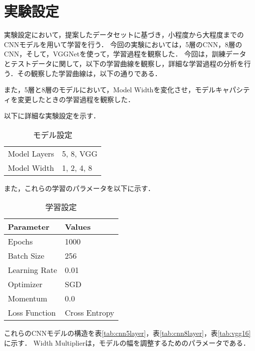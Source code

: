 \section{実験設定}
\label{sec:experiment_settings}
実験設定において，提案したデータセットに基づき，小程度から大程度までのCNNモデルを用いて学習を行う．
今回の実験においては，5層のCNN，8層のCNN，そして，VGGNetを使って，学習過程を観察した．
今回は，訓練データとテストデータに関して，以下の学習曲線を観察し，詳細な学習過程の分析を行う．その観察した学習曲線は，以下の通りである．


また，5層と8層のモデルにおいて，Model Widthを変化させ，モデルキャパシティを変更したときの学習過程を観察した．

以下に詳細な実験設定を示す．

\begin{table}[ht]
    \centering
    \caption{モデル設定}
    \begin{tabular}{ll}
        \midrule
        Model Layers & 5, 8, VGG \\
        Model Width & 1, 2, 4, 8 \\
        \bottomrule
    \end{tabular}
    \label{tab:model_settings}
\end{table}

また，これらの学習のパラメータを以下に示す．

\begin{table}[ht]
    \centering
    \caption{学習設定}
    \begin{tabular}{ll}
        \toprule
        \textbf{Parameter} & \textbf{Values} \\
        \midrule
        Epochs & 1000 \\
        Batch Size & 256 \\
        Learning Rate & 0.01 \\
        Optimizer & SGD \\
        Momentum & 0.0 \\
        Loss Function & Cross Entropy \\
        \bottomrule
    \end{tabular}
    \label{tab:training_settings}
\end{table}

これらのCNNモデルの構造を表\ref{tab:cnn5layer}，表\ref{tab:cnn8layer}，表\ref{tab:vgg16}に示す．
Width Multiplierは，モデルの幅を調整するためのパラメータである．

